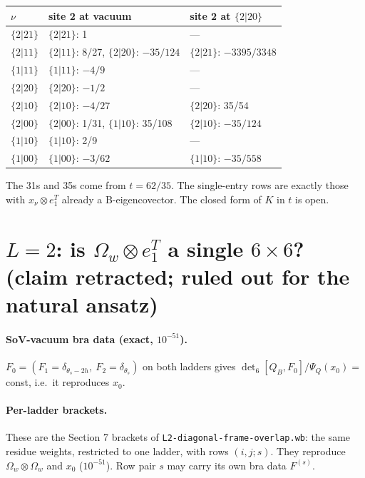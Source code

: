 \documentclass[11pt]{article}
\newcommand{\Om}{\Omega}
\begin{document}
\begin{center}
\begin{tabular}{lll}
\toprule
$\nu$ & site 2 at vacuum & site 2 at $\{2|20\}$\\
\midrule
$\{2|21\}$ & $\{2|21\}$: 1 & ---\\
$\{2|11\}$ & $\{2|11\}$: 8/27, $\{2|20\}$: $-35/124$ & $\{2|21\}$: $-3395/3348$\\
$\{1|11\}$ & $\{1|11\}$: $-4/9$ & ---\\
$\{2|20\}$ & $\{2|20\}$: $-1/2$ & ---\\
$\{2|10\}$ & $\{2|10\}$: $-4/27$ & $\{2|20\}$: 35/54\\
$\{2|00\}$ & $\{2|00\}$: 1/31, $\{1|10\}$: 35/108 & $\{2|10\}$: $-35/124$\\
$\{1|10\}$ & $\{1|10\}$: 2/9 & ---\\
$\{1|00\}$ & $\{1|00\}$: $-3/62$ & $\{1|10\}$: $-35/558$\\
\bottomrule
\end{tabular}
\end{center}

The 31s and 35s come from $t=62/35$. The single-entry rows are exactly those with $x_\nu\otimes e_1^T$ already a B-eigencovector. The closed form of $K$ in $t$ is open.

\section{$L=2$: is $\Om_w\otimes e_1^T$ a single $6\times6$? (claim retracted; ruled out for the natural ansatz)}\label{sec:main}

\paragraph{SoV-vacuum bra data (exact, $10^{-51}$).} $F_0=(F_1=\delta_{\theta_s-2h},\ F_2=\delta_{\theta_s})$ on both ladders gives $\det_6[Q_B,F_0]/\Psi_Q(x_0)=$ const, i.e.\ it reproduces $x_0$.

\paragraph{Per-ladder brackets.} These are the Section 7 brackets of \texttt{L2-diagonal-frame-overlap.wb}: the same residue weights, restricted to one ladder, with rows $(i,j;s)$. They reproduce $\Om_w\otimes\Om_w$ and $x_0$ ($10^{-51}$). Row pair $s$ may carry its own bra data $F^{(s)}$.
\end{document}
